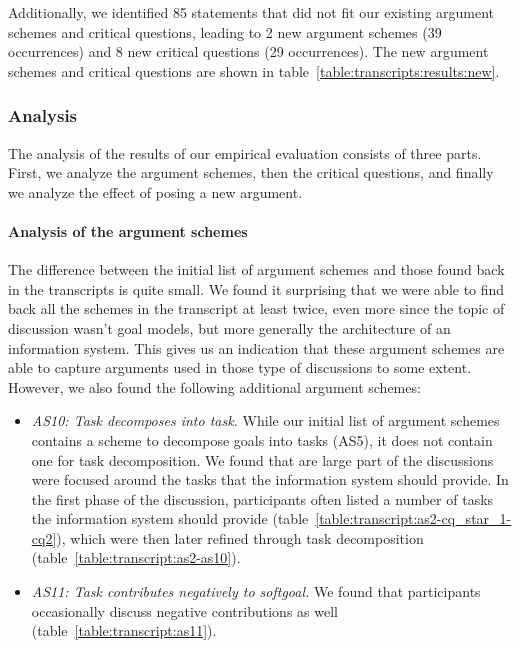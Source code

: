 Additionally, we identified 85 statements that did not fit our existing argument schemes and critical questions, leading to 2 new argument schemes (39 occurrences) and 8 new critical questions (29 occurrences). The new argument schemes and critical questions are shown in table~\ref{table:transcripts:results:new}. 

\subsubsection{Analysis}

The analysis of the results of our empirical evaluation consists of three parts. First, we analyze the argument schemes, then the critical questions, and finally we analyze the effect of posing a new argument.

\paragraph{Analysis of the argument schemes}
The difference between the initial list of argument schemes and those found back in the transcripts is quite small. We found it surprising that we were able to find back all the schemes in the transcript at least twice, even more since the topic of discussion wasn't goal models, but more generally the architecture of an information system. This gives us an indication that these argument schemes are able to capture arguments used in those type of discussions to some extent. However, we also found the following additional argument schemes:
\begin{itemize}
\item
\emph{AS10: Task decomposes into task.} While our initial list of argument schemes contains a scheme to decompose goals into tasks (AS5), it does not contain one for task decomposition. We found that are large part of the discussions were focused around the tasks that the information system should provide. In the first phase of the discussion, participants often listed a number of tasks the information system should provide (table~\ref{table:transcript:as2-cq_star_1-cq2}), which were then later refined through task decomposition (table~\ref{table:transcript:as2-as10}).
\item 
\emph{AS11: Task contributes negatively to softgoal.}  We found that participants occasionally discuss negative contributions as well (table~\ref{table:transcript:as11}).
\end{itemize}
